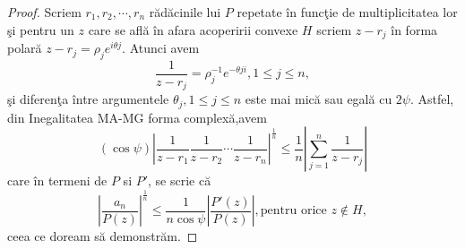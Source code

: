 \documentclass[a4paper,12pt,oneside]{report}
\begin{document}
\begin{proof}
Scriem \(r_{1} , r_{2} ,\cdots,r_{n}\) r\u{a}d\u{a}cinile lui \(P\) repetate \^{i}n func\c{t}ie de multiplicitatea lor \c{s}i pentru un \(z\) care se afl\u{a} \^{i}n afara acoperirii convexe \(H\) scriem \(z - r_{j}\) \^{i}n forma polar\u{a} \(z - r_{j} = \rho _{j}e^{i\theta j}\). Atunci avem
\begin{displaymath}
  \frac{1}{z - r_{j}} = \rho _{j}^{-1}e^{-\theta ji} , 1 \leq  j \leq  n,
\end{displaymath}
\c{s}i diferen\c{t}a \^{i}ntre argumentele \(\theta _{j}, 1 \leq j\leq n\) este mai mic\u{a} sau egal\u{a} cu \(2\psi\). Astfel, din Inegalitatea  MA-MG forma complex\u{a},avem
\begin{displaymath}
  \left ( \cos\psi  \right )\left | \frac{1}{z - r_{1}} \frac{1}{z - r_{2}}\cdots \frac{1}{z - r_{n}} \right|^{\frac{1}{n}} \leq  \frac{1}{n} \left | \sum_{j = 1}^{n}\frac{1}{z - r_{j}} \right |
\end{displaymath}
care \^{i}n termeni de \(P\) si \({P}'\), se scrie c\u{a}
\begin{displaymath}
   \left | \frac{a_{n}}{P\left ( z \right )} \right |^{\frac{1}{n}}\leq \frac{1}{n\cos\psi }\left | \frac{{P}'\left ( z \right )}{P\left ( z \right )} \right |,  \text{pentru orice }z \notin H,
\end{displaymath}
 ceea ce doream s\u{a} demonstr\u{a}m.
\end{proof}
\end{document}
